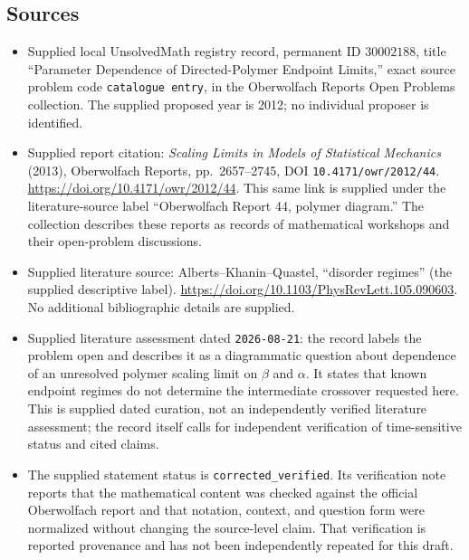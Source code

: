 \documentclass[11pt]{article}
\begin{document}
\subsection{Sources}
\begin{itemize}
\item Supplied local UnsolvedMath registry record, permanent ID \(30002188\), title ``Parameter Dependence of Directed-Polymer Endpoint Limits,'' exact source problem code \texttt{catalogue entry}, in the Oberwolfach Reports Open Problems collection. The supplied proposed year is 2012; no individual proposer is identified.
\item Supplied report citation: \emph{Scaling Limits in Models of Statistical Mechanics} (2013), Oberwolfach Reports, pp.~2657--2745, DOI \texttt{10.4171/owr/2012/44}. \url{https://doi.org/10.4171/owr/2012/44}. This same link is supplied under the literature-source label ``Oberwolfach Report 44, polymer diagram.'' The collection describes these reports as records of mathematical workshops and their open-problem discussions.
\item Supplied literature source: Alberts--Khanin--Quastel, ``disorder regimes'' (the supplied descriptive label). \url{https://doi.org/10.1103/PhysRevLett.105.090603}. No additional bibliographic details are supplied.
\item Supplied literature assessment dated \texttt{2026-08-21}: the record labels the problem open and describes it as a diagrammatic question about dependence of an unresolved polymer scaling limit on $\beta$ and $\alpha$. It states that known endpoint regimes do not determine the intermediate crossover requested here. This is supplied dated curation, not an independently verified literature assessment; the record itself calls for independent verification of time-sensitive status and cited claims.
\item The supplied statement status is \texttt{corrected\_verified}. Its verification note reports that the mathematical content was checked against the official Oberwolfach report and that notation, context, and question form were normalized without changing the source-level claim. That verification is reported provenance and has not been independently repeated for this draft.
\end{itemize}
\end{document}

